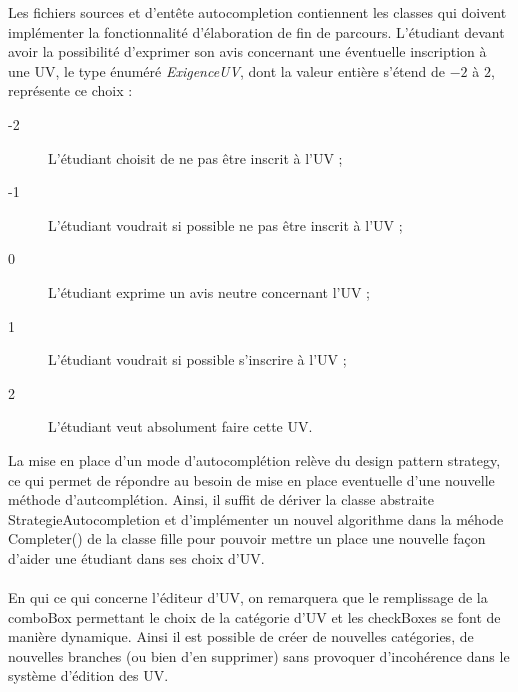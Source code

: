 \documentclass[a4paper,10pt,french]{report}
\begin{document}
	
	Les fichiers sources et d'entête autocompletion contiennent les classes qui doivent implémenter la fonctionnalité d'élaboration de fin  de parcours.
	L'étudiant devant avoir la possibilité d'exprimer son avis concernant une éventuelle inscription à une UV, le type énuméré \emph{ExigenceUV}, dont la valeur entière s'étend de $-2$ à $2$, représente ce choix : 
	\begin{description}
	\item[-2] L'étudiant choisit de ne pas être inscrit à l'UV ;
	\item[-1] L'étudiant voudrait si possible ne pas être inscrit à l'UV ;	
	\item[0] L'étudiant exprime un avis neutre concernant l'UV ;
	\item[1] L'étudiant voudrait si possible s'inscrire à l'UV ;
	\item[2] L'étudiant veut absolument faire cette UV.
	\end{description}
	
	La mise en place d'un mode d'autocomplétion relève du design pattern strategy, ce qui permet de répondre au besoin de mise en place eventuelle d'une nouvelle méthode d'autcomplétion.
	Ainsi, il suffit de dériver la classe abstraite StrategieAutocompletion et d'implémenter un nouvel algorithme dans la méhode Completer() de la classe fille pour pouvoir mettre un place une nouvelle façon d'aider une étudiant dans ses choix d'UV.\\\\
	
	En qui ce qui concerne l'éditeur d'UV, on remarquera que le remplissage de la comboBox permettant le choix de la catégorie d'UV et les checkBoxes se font de manière dynamique. Ainsi il est possible de créer de nouvelles catégories, de nouvelles branches (ou bien d'en supprimer) sans provoquer d'incohérence dans le système d'édition des UV.
	
	
	
	
	
		\subsubsection{}
			\paragraph{}
			\paragraph{}
\end{document}
